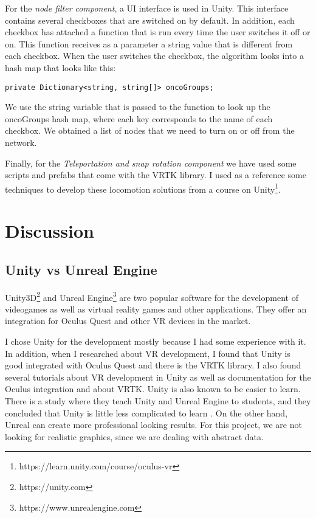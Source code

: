 For the \textit{node filter component}, a UI interface is used in Unity. This interface contains several checkboxes that are switched on by default. In addition, each checkbox has attached a function that is run every time the user switches it off or on. This function receives as a parameter a string value that is different from each checkbox. When the user switches  the checkbox, the algorithm looks into a hash map that looks like this:

\begin{verbatim}
private Dictionary<string, string[]> oncoGroups;
\end{verbatim}

We use the string variable that is passed to the function to look up the oncoGroups hash map, where each key corresponds to the name of each checkbox. We obtained a list of nodes that we need to turn on or off from the network.

Finally, for the \textit{Teleportation and snap rotation component} we have used some scripts and prefabs that come with the VRTK library. I used as a reference some techniques to develop these locomotion solutions from a course on Unity\footnote{https://learn.unity.com/course/oculus-vr}.

\section{Discussion}

\subsection{Unity vs Unreal Engine}
Unity3D\footnote{https://unity.com} and Unreal Engine\footnote{https://www.unrealengine.com} are two popular software for the development of videogames as well as virtual reality games and other applications. They offer an integration for Oculus Quest and other VR devices in the market.

I chose Unity for the development mostly because I had some experience with it. In addition, when I researched about VR development, I found that Unity is good integrated with Oculus Quest and there is the VRTK library. I also found several tutorials about VR development in Unity as well as documentation for the Oculus integration and about VRTK. Unity is also known to be easier to learn. There is a study where they teach Unity and Unreal Engine to students, and they concluded that Unity is little less complicated to learn \cite{unity_vs_unreal}. On the other hand, Unreal can create more professional looking results. For this project, we are not looking for realistic graphics, since we are dealing with abstract data.

